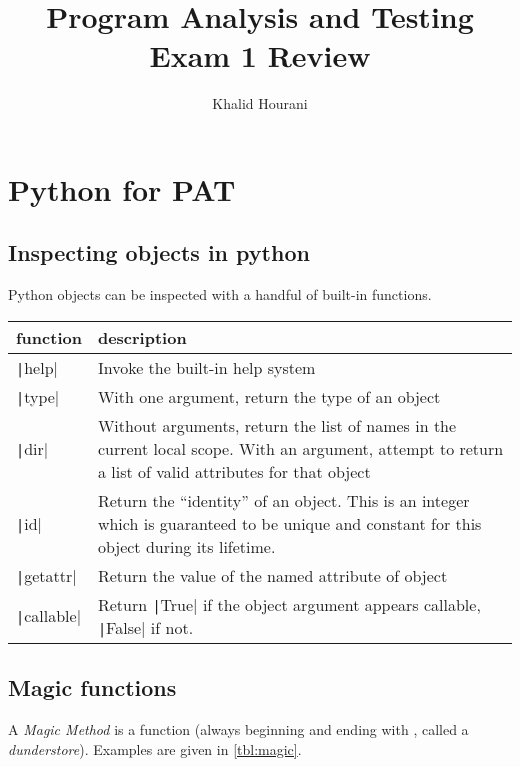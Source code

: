 \documentclass{article}
\title{Program Analysis and Testing\\Exam 1 Review}
\author{Khalid Hourani}
\begin{document}
\maketitle
\section{Python for PAT} 
\subsection{Inspecting objects in python}
Python objects can be inspected with a handful of built-in functions.
\begin{table}[H]
\begin{tabular}{l p{10cm}}
  function & description\\\toprule
  \texttt|help| & Invoke the built-in help system\\\cmidrule{2-2}
  \texttt|type| & With one argument, return the type of an object\\\cmidrule{2-2}
  \texttt|dir| & Without arguments, return the list of names in the current local scope. With an argument, attempt to return a list of valid attributes for that object\\\cmidrule{2-2}
  \texttt|id| & Return the “identity” of an object. This is an integer which is guaranteed to be unique and constant for this object during its lifetime.\\\cmidrule{2-2}
  \texttt|getattr| & Return the value of the named attribute of object\\\cmidrule{2-2}
  \texttt|callable| & Return \texttt|True| if the object argument appears callable, \texttt|False| if not.
\end{tabular}
\end{table}

\subsection{Magic functions}
A \emph{Magic Method} is a function (always beginning and ending with \texttt{\textunderscore\textunderscore},
called a \emph{dunderstore}). Examples are given in \cref{tbl:magic}.
\end{document}
